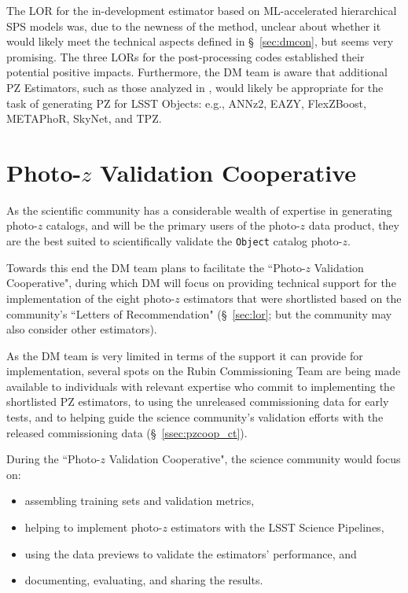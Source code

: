 \documentclass[DM,authoryear,toc]{lsstdoc}
\begin{document}
The LOR for the in-development estimator based on ML-accelerated hierarchical SPS models was, due to the newness of the method, unclear about whether it would likely meet the technical aspects defined in \S~\ref{sec:dmcon}, but seems very promising.
The three LORs for the post-processing codes established their potential positive impacts.
Furthermore, the DM team is aware that additional PZ Estimators, such as those analyzed in \cite{2020MNRAS.499.1587S}, would likely be appropriate for the task of generating PZ for LSST Objects: e.g., ANNz2, EAZY, FlexZBoost, METAPhoR, SkyNet, and TPZ.



\section{Photo-$z$ Validation Cooperative}\label{sec:pzcoop}

As the scientific community has a considerable wealth of expertise in generating photo-$z$ catalogs, and will be the primary users of the photo-$z$ data product, they are the best suited to scientifically validate the {\tt Object} catalog photo-$z$.

Towards this end the DM team plans to facilitate the ``Photo-$z$ Validation Cooperative", during which DM will focus on providing technical support for the implementation of the eight photo-$z$ estimators that were shortlisted based on the community's ``Letters of Recommendation" (\S~\ref{sec:lor}; but the community may also consider other estimators).

As the DM team is very limited in terms of the support it can provide for implementation, several spots on the Rubin Commissioning Team are being made available to individuals with relevant expertise who commit to implementing the shortlisted PZ estimators, to using the unreleased commissioning data for early tests, and to helping guide the science community's validation efforts with the released commissioning data (\S~\ref{ssec:pzcoop_ct}).

During the ``Photo-$z$ Validation Cooperative", the science community would focus on:
\begin{itemize}
\item assembling training sets and validation metrics,
\item helping to implement photo-$z$ estimators with the LSST Science Pipelines,
\item using the data previews to validate the estimators' performance, and
\item documenting, evaluating, and sharing the results.
\end{itemize}
\end{document}
